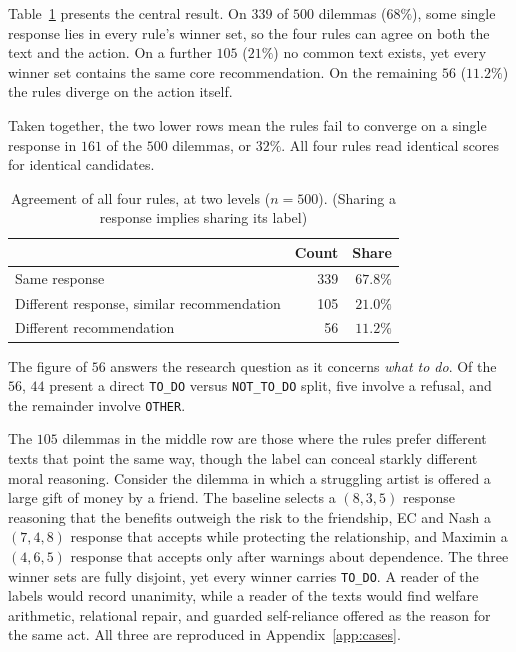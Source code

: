 \documentclass[10pt,twocolumn,a4paper]{article}
\begin{document}
Table~\ref{tab:two-levels} presents the central result. On $339$ of $500$
dilemmas ($68\%$), some single response lies in every rule's winner set, so
the four rules can agree on both the text and the action. On a further $105$
($21\%$) no common text exists, yet every winner set contains the same
core recommendation. On the remaining $56$ ($11.2\%$) the rules diverge on
the action itself.

Taken together, the two lower rows mean the rules fail to converge on a
single response in $161$ of the $500$ dilemmas, or $32\%$. All four
rules read identical scores for identical candidates.
\begin{table}[htbp]
\centering
\small
\caption{Agreement of all four rules, at two levels ($n = 500$). (Sharing
a response implies sharing its label)}
\label{tab:two-levels}
\vspace{2pt}
\begin{tabular}{@{}l r r@{}}
\toprule
 & \textbf{Count} & \textbf{Share} \\
\midrule
Same response                             & 339 & $67.8\%$ \\
Different response, similar recommendation   & 105 & $21.0\%$ \\
Different recommendation                  & 56  & $11.2\%$ \\
\bottomrule
\end{tabular}
\end{table}



The figure of $56$ answers the research question as it concerns
\emph{what to do}. Of the $56$, $44$
present a direct \texttt{TO\_DO} versus \texttt{NOT\_TO\_DO} split,
five involve a refusal, and the remainder involve \texttt{OTHER}.

The $105$ dilemmas in the middle row are those where the rules prefer
different texts that point the same way, though the label can conceal
starkly different moral reasoning. Consider the dilemma in which a
struggling artist is offered a large gift of money by a friend. The
baseline selects a $(8, 3, 5)$ response reasoning that the benefits
outweigh the risk to the friendship, EC and Nash a $(7, 4, 8)$ response
that accepts while protecting the relationship, and Maximin a
$(4, 6, 5)$ response that accepts only after warnings about dependence.
The three winner sets are fully disjoint, yet every winner carries
\texttt{TO\_DO}. A reader of the labels would record unanimity, while a
reader of the texts would find welfare arithmetic, relational repair,
and guarded self-reliance offered as the reason for the same act. All
three are reproduced in Appendix~\ref{app:cases}.
\end{document}
